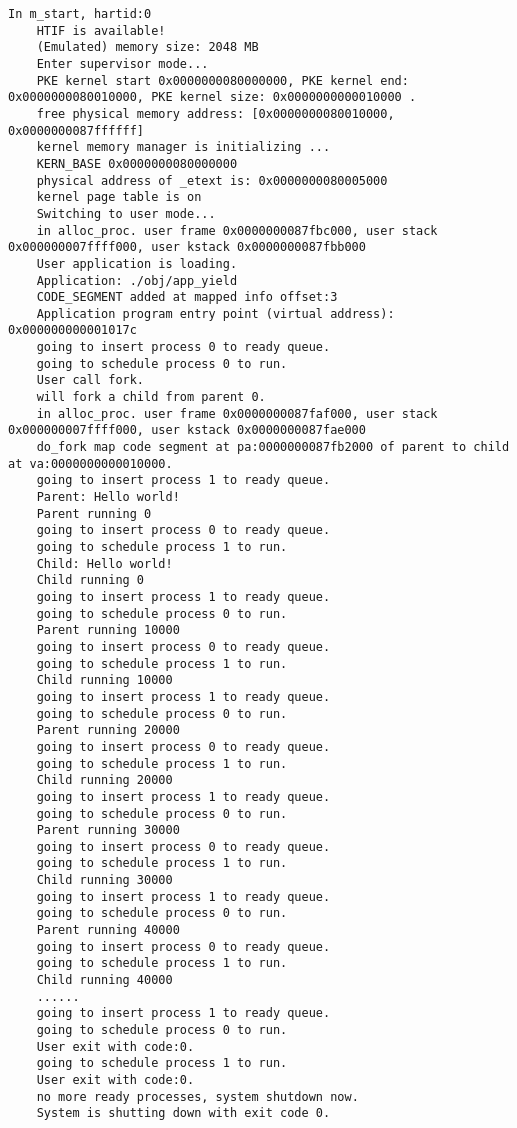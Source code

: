 \begin{lstlisting}[caption={lab8实验结果（移植K210前）}]
    In m_start, hartid:0
    HTIF is available!
    (Emulated) memory size: 2048 MB
    Enter supervisor mode...
    PKE kernel start 0x0000000080000000, PKE kernel end: 0x0000000080010000, PKE kernel size: 0x0000000000010000 .
    free physical memory address: [0x0000000080010000, 0x0000000087ffffff]
    kernel memory manager is initializing ...
    KERN_BASE 0x0000000080000000
    physical address of _etext is: 0x0000000080005000
    kernel page table is on
    Switching to user mode...
    in alloc_proc. user frame 0x0000000087fbc000, user stack 0x000000007ffff000, user kstack 0x0000000087fbb000
    User application is loading.
    Application: ./obj/app_yield
    CODE_SEGMENT added at mapped info offset:3
    Application program entry point (virtual address): 0x000000000001017c
    going to insert process 0 to ready queue.
    going to schedule process 0 to run.
    User call fork.
    will fork a child from parent 0.
    in alloc_proc. user frame 0x0000000087faf000, user stack 0x000000007ffff000, user kstack 0x0000000087fae000
    do_fork map code segment at pa:0000000087fb2000 of parent to child at va:0000000000010000.
    going to insert process 1 to ready queue.
    Parent: Hello world!
    Parent running 0
    going to insert process 0 to ready queue.
    going to schedule process 1 to run.
    Child: Hello world!
    Child running 0
    going to insert process 1 to ready queue.
    going to schedule process 0 to run.
    Parent running 10000
    going to insert process 0 to ready queue.
    going to schedule process 1 to run.
    Child running 10000
    going to insert process 1 to ready queue.
    going to schedule process 0 to run.
    Parent running 20000
    going to insert process 0 to ready queue.
    going to schedule process 1 to run.
    Child running 20000
    going to insert process 1 to ready queue.
    going to schedule process 0 to run.
    Parent running 30000
    going to insert process 0 to ready queue.
    going to schedule process 1 to run.
    Child running 30000
    going to insert process 1 to ready queue.
    going to schedule process 0 to run.
    Parent running 40000
    going to insert process 0 to ready queue.
    going to schedule process 1 to run.
    Child running 40000
    ......
    going to insert process 1 to ready queue.
    going to schedule process 0 to run.
    User exit with code:0.
    going to schedule process 1 to run.
    User exit with code:0.
    no more ready processes, system shutdown now.
    System is shutting down with exit code 0.    
\end{lstlisting}

